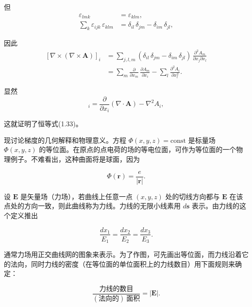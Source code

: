 \documentclass[11pt,a4paper,oneside]{ctexbook}
\newcommand{\ve}[1]{\bm{#1}}
\begin{document}
但
\begin{equation*}
\begin{aligned}
\varepsilon_{lmk} &= \varepsilon_{klm},\\
\sum_{k} \varepsilon_{ijk}\, \varepsilon_{klm} &= \delta_{il}\, \delta_{jm} - \delta_{im}\, \delta_{jl},
\end{aligned}
\end{equation*}

因此
\begin{equation*}
\begin{aligned}
[\nabla \times (\nabla \times \ve{A})]_i
&= \sum_{j,l,m} (\delta_{il}\, \delta_{jm} - \delta_{im}\, \delta_{jl})\, \frac{\partial^{2} A_m}{\partial x_j \partial x_l}\\
&= \sum_{m} \frac{\partial}{\partial x_m}\, \frac{\partial A_m}{\partial x_i} - \sum_{l} \frac{\partial^{2} A_i}{\partial x_l^{2}}.
\end{aligned}
\end{equation*}

显然
\begin{equation*}
[\nabla \times (\nabla \times \ve{A})]_i = \frac{\partial}{\partial x_i} (\nabla \cdot \ve{A}) - \nabla^{2} A_i,
\end{equation*}

这就证明了恒等式(1.33)。

现讨论梯度的几何解释和物理意义。方程 $\Phi(x, y, z) = \text{const}$ 是标量场 $\Phi(x, y, z)$ 的等位面。在原点的点电荷的场的等电位面，可作为等位面的一个物理例子。不难看出，这种曲面将是球面，因为

\begin{equation*}
\Phi(\ve{r}) = \frac{e}{|\ve{r}|}.
\end{equation*}

设 $\ve{E}$ 是矢量场（力场），若曲线上任意一点 $(x, y, z)$ 处的切线方向都与 $\ve{E}$ 在该点处的方向一致，则此曲线称为力线。力线的无限小线素用 $d\ve{s}$ 表示。由力线的这个定义推出

\begin{equation*}
\frac{dx_1}{E_1} = \frac{dx_2}{E_2} = \frac{dx_3}{E_3}.
\end{equation*}

通常力场用正交曲线网的图象来表示。为了作图，可先画出等位面，而力线沿着它的法向，同时力线的密度（在等位面的单位面积上的力线数目）用下面规则来确定：

\begin{equation*}
\frac{\text{力线的数目}}{(\text{法向的})\ \text{面积}} = |\ve{E}|.
\end{equation*}
\end{document}
